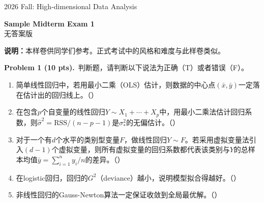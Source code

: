 \documentclass[UTF8,a4paper,11pt,fontset=fandol]{ctexart}
\newcommand{\blank}{\mbox{（\hspace{1.5em}）}}
\newcommand{\problem}[2]{\par\addvspace{10pt}\Needspace{5\baselineskip}\textbf{Problem #1 (#2 pts).}\ }
\newcommand{\examheader}[2]{%
  {\large #1 Fall: High-dimensional Data Analysis}\par
  \vspace{6pt}
  \begin{center}{\Large\bfseries #2}\\[3pt]{\small 无答案版}\end{center}
  \vspace{2pt}}
\begin{document}
\examheader{2026}{Sample Midterm Exam 1}
\textbf{说明：}本样卷供同学们参考。正式考试中的风格和难度与此样卷类似。

\problem{1}{10}判断题，请判断以下说法为正确（T）或者错误（F）。
\begin{enumerate}
  \item 简单线性回归中，若用最小二乘（OLS）估计，则数据的中心点$(\bar x,\bar y)$一定落在估计出的回归线上。\blank
  \item 在包含$p$个自变量的线性回归$Y\sim X_1+\cdots+X_p$中，用最小二乘法估计回归系数，则$\widehat\sigma^2=\mathrm{RSS}/(n-p-1)$是$\sigma_*^2$的无偏估计。\blank
  \item 对于一个有$d$个水平的类别型变量$F$，做线性回归$Y\sim F$。若采用虚拟变量法引入$(d-1)$个虚拟变量，则所有虚拟变量的回归系数都代表该类别与$Y$的总样本均值$\bar y=\sum_{i=1}^n y_i/n$的差异。\blank
  \item 在logistic回归，回归的$G^2$（deviance）越小，说明模型拟合得越好。\blank
  \item 非线性回归的Gauss-Newton算法一定保证收敛到全局最优解。\blank
\end{enumerate}
\end{document}
